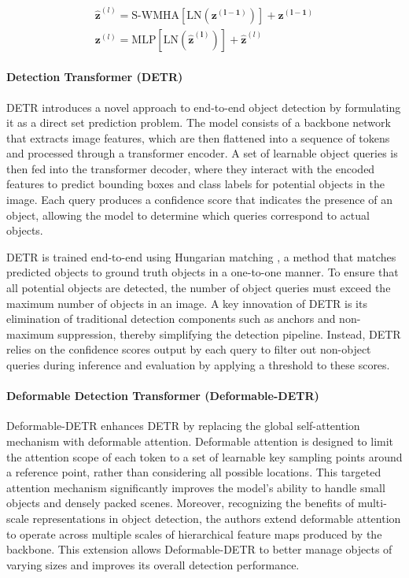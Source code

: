 \begin{align}
\label{eq:swin}
\mathbf{\hat{z}}^{(l)} = \text{S-WMHA} \left [ \text{LN} \left ( \mathbf{z^{(l-1)}} \right ) \right ] + \mathbf{z^{(l-1)}}\\
\mathbf{z}^{(l)} =  \text{MLP} \left [ \text{LN} \left ( \mathbf{\hat{z}^{(l)}} \right ) \right ] + \mathbf{\hat{z}}^{(l)}
\end{align}


\paragraph{Detection Transformer (DETR) \cite{carion2020end}} DETR introduces a novel approach to end-to-end object detection by formulating it as a direct set prediction problem. The model consists of a backbone network that extracts image features, which are then flattened into a sequence of tokens and processed through a transformer encoder. A set of learnable object queries is then fed into the transformer decoder, where they interact with the encoded features to predict bounding boxes and class labels for potential objects in the image. Each query produces a confidence score that indicates the presence of an object, allowing the model to determine which queries correspond to actual objects.

DETR is trained end-to-end using Hungarian matching \cite{kuhn1955hungarian}, a method that matches predicted objects to ground truth objects in a one-to-one manner. To ensure that all potential objects are detected, the number of object queries must exceed the maximum number of objects in an image. A key innovation of DETR is its elimination of traditional detection components such as anchors and non-maximum suppression, thereby simplifying the detection pipeline. Instead, DETR relies on the confidence scores output by each query to filter out non-object queries during inference and evaluation by applying a threshold to these scores.

\paragraph{Deformable Detection Transformer (Deformable-DETR) \cite{zhu2020deformable}} Deformable-DETR enhances DETR by replacing the global self-attention mechanism with deformable attention. Deformable attention is designed to limit the attention scope of each token to a set of learnable key sampling points around a reference point, rather than considering all possible locations. This targeted attention mechanism significantly improves the model's ability to handle small objects and densely packed scenes. Moreover, recognizing the benefits of multi-scale representations in object detection, the authors extend deformable attention to operate across multiple scales of hierarchical feature maps produced by the backbone. This extension allows Deformable-DETR to better manage objects of varying sizes and improves its overall detection performance.


